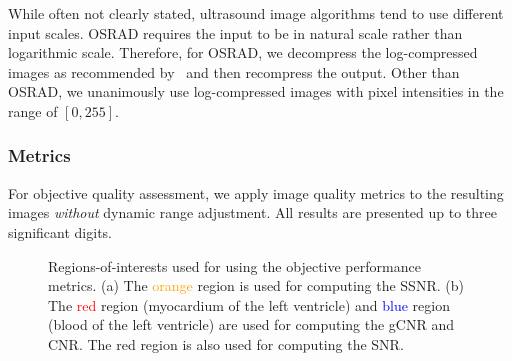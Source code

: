While often not clearly stated, ultrasound image algorithms tend to use different input scales.
OSRAD requires the input to be in natural scale rather than logarithmic scale.
Therefore, for OSRAD, we decompress the log-compressed images as recommended by~\cite{yongjianyu_generalized_2004} and then recompress the output.
Other than OSRAD, we unanimously use log-compressed images with pixel intensities in the range of \([0, 255]\).
\subsubsection{Metrics}
For objective quality assessment, we apply image quality metrics to the resulting images \textit{without} dynamic range adjustment.
All results are presented up to three significant digits.

%
\begin{figure}[t]
  \centering
  \caption{Regions-of-interests used for using the objective performance metrics.
    (a) The \textcolor{orange}{orange} region is used for computing the SSNR.
    (b) The \textcolor{red}{red} region (myocardium of the left ventricle) and \textcolor{blue}{blue} region (blood of the left ventricle) are used for computing the gCNR and CNR.
    The red region is also used for computing the SNR.
  }\label{fig:roi}
  \vspace{-0.1in}
\end{figure}
% 

